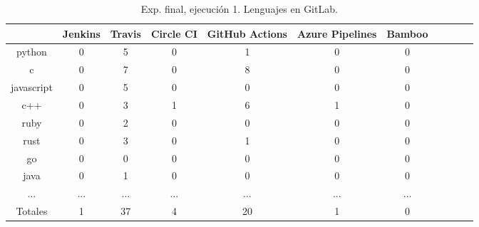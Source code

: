 \begin{table}
  \centering
  \caption{Exp. final, ejecución 1. Lenguajes en GitLab.}
  \label{tab:tabla_f1_6a}

\begin{footnotesize}
\renewcommand{\arraystretch}{1.5} %
\begin{tabular}{ccccccccccc}
  \hline
  {} &  Jenkins &  Travis &  Circle CI &  GitHub Actions &  Azure Pipelines &  Bamboo \\
  \hline
  python           &        0 &       5 &          0 &               1 &                0 &       0 \\
  c                &        0 &       7 &          0 &               8 &                0 &       0 \\
  javascript       &        0 &       5 &          0 &               0 &                0 &       0 \\
  c++              &        0 &       3 &          1 &               6 &                1 &       0 \\
  ruby             &        0 &       2 &          0 &               0 &                0 &       0 \\
  rust             &        0 &       3 &          0 &               1 &                0 &       0 \\
  go               &        0 &       0 &          0 &               0 &                0 &       0 \\
  java             &        0 &       1 &          0 &               0 &                0 &       0 \\
  ...              &      ... &     ... &        ... &             ... &              ... &     ... \\
  \hline
  Totales          &        1 &      37 &          4 &              20 &                1 &       0 \\
 \end{tabular}
\end{footnotesize}

\end{table}

